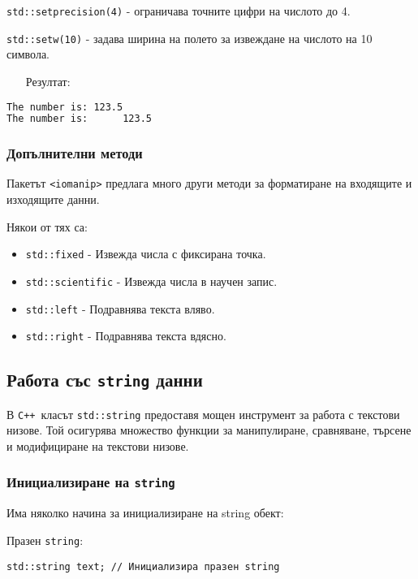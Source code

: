 \documentclass[oneside]{book}
\newcommand*{\code}[1]{\texttt{#1}}
\newcommand*{\cpp}{\texttt{C++}\ }
\begin{document}
\code{std::setprecision(4)} - ограничава точните цифри на числото до 4.

\code{std::setw(10)} - задава ширина на полето за извеждане на числото на 10 символа.

\begin{itemize}
    \item[Резултат:]
\end{itemize} 
\vspace{-4pt}\begin{mdframed}\begin{lstlisting}[language=bash]
The number is: 123.5
The number is:      123.5
\end{lstlisting}\end{mdframed}

\subsubsection{Допълнителни методи}
Пакетът \code{<iomanip>} предлага много други методи за форматиране на входящите и изходящите данни.

Някои от тях са:
\begin{itemize}
    \item \code{std::fixed} - Извежда числа с фиксирана точка.
    \item \code{std::scientific} - Извежда числа в научен запис.
    \item \code{std::left} - Подравнява текста вляво.
    \item \code{std::right} - Подравнява текста вдясно.
\end{itemize}

\subsection{Работа със \code{string} данни}\label{sec:string}
В \cpp класът \code{std::string} предоставя мощен инструмент за работа с текстови низове. Той осигурява множество функции за манипулиране, сравняване, търсене и модифициране на текстови низове.

\subsubsection{Инициализиране на \code{string}}
Има няколко начина за инициализиране на string обект:

Празен \code{string}:
\begin{mdframed}\begin{lstlisting}
std::string text; // Инициализира празен string
\end{lstlisting}\end{mdframed}
\end{document}
